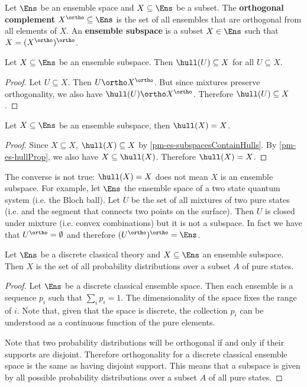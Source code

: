 \begin{defn}
	Let $\Ens$ be an ensemble space and $X \subseteq \Ens$ be a subset. The \textbf{orthogonal complement} $X^\ortho \subseteq \Ens$ is the set of all ensembles that are orthogonal from all elements of $X$. An \textbf{ensemble subspace} is a subset $X \in \Ens$ such that $X = (X^\ortho)^\ortho$.
\end{defn}

\begin{prop}\label{pm-es-subspacesContainHulls}
	Let $X \subseteq \Ens$ be an ensemble subspace. Then $\hull(U) \subseteq X$ for all $U \subseteq X$.
\end{prop}

\begin{proof}
	Let $U \subseteq X$. Then $U \ortho X^{\ortho}$. But since mixtures preserve orthogonality, we also have $\hull(U) \ortho X^{\ortho}$. Therefore $\hull(U) \subseteq X$.
\end{proof}

\begin{coro}
	Let $X \subseteq \Ens$ be an ensemble subspace, then $\hull(X) = X$.
\end{coro}

\begin{proof}
	Since $X \subseteq X$, $\hull(X) \subseteq X$ by \ref{pm-es-subspacesContainHulls}. By \ref{pm-es-hullProp}, we also have $X \subseteq \hull(X)$. Therefore $\hull(X) = X$.
\end{proof}

\begin{remark}
	The converse is not true: $\hull(X) = X$ does not mean $X$ is an ensemble subspace. For example, let $\Ens$ the ensemble space of a two state quantum system (i.e. the Bloch ball). Let $U$ be the set of all mixtures of two pure states (i.e. and the segment that connects two points on the surface). Then $U$ is closed under mixture (i.e. convex combinations) but it is not a subspace. In fact we have that $U^{\ortho}=\emptyset$ and therefore $(U^\ortho)^\ortho = \Ens$.
\end{remark}

\begin{prop}
	Let $\Ens$ be a discrete classical theory and $X \subseteq \Ens$ an ensemble subspace. Then $X$ is the set of all probability distributions over a subset $A$ of pure states.
\end{prop}

\begin{proof}
	Let $\Ens$ be a discrete classical ensemble space. Then each ensemble is a sequence $p_i$ such that $\sum_i p_i = 1$. The dimensionality of the space fixes the range of $i$. Note that, given that the space is discrete, the collection $p_i$ can be understood as a continuous function of the pure elements.
	
	Note that two probability distributions will be orthogonal if and only if their supports are disjoint. Therefore orthogonality for a discrete classical ensemble space is the same as having disjoint support. This means that a subspace is given by all possible probability distributions over a subset $A$ of all pure states.
\end{proof}

